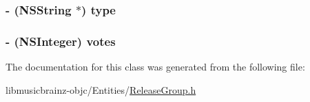 \hypertarget{interface_release_group_a79e0fe8a13b16cdad084603084092076}{
\subsubsection[{type}]{\setlength{\rightskip}{0pt plus 5cm}-\/ (N\-S\-String $\ast$) {\bf type}}}\label{interface_release_group_a79e0fe8a13b16cdad084603084092076}
\hypertarget{interface_release_group_a12ad0c50a63cf6bdd3469f775aef06cb}{
\subsubsection[{votes}]{\setlength{\rightskip}{0pt plus 5cm}-\/ (N\-S\-Integer) {\bf votes}}}\label{interface_release_group_a12ad0c50a63cf6bdd3469f775aef06cb}


The documentation for this class was generated from the following file\-:\begin{DoxyCompactItemize}
\item 
libmusicbrainz-\/objc/\-Entities/\hyperlink{_release_group_8h}{Release\-Group.\-h}\end{DoxyCompactItemize}
